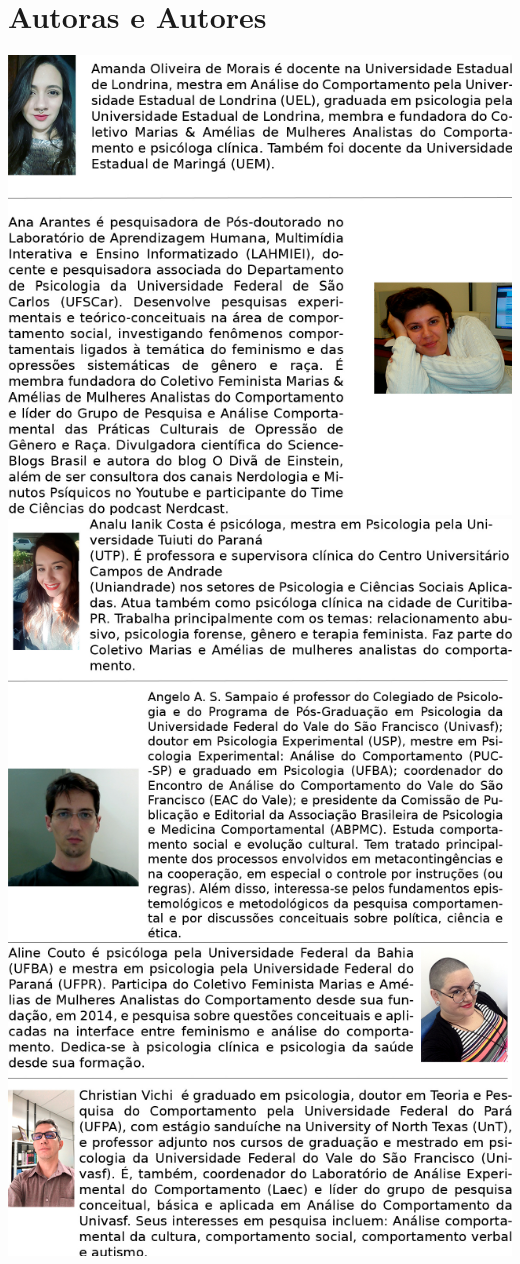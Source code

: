 \chapter*{Autoras e Autores}
\noindent
\includegraphics[scale=1]{autoras/autorasfinal1}\\
\newpage
\noindent
\includegraphics[scale=1]{autoras/autorasfinal2}